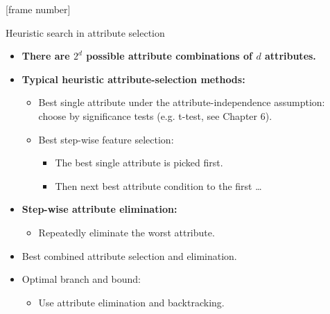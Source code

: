 \documentclass[aspectratio=169,t]{beamer}
\begin{document}
  {
    [frame number]
    \begin{frame}{Heuristic search in attribute selection}
    \begin{itemize}
      \item \textbf{There are $2^d$ possible attribute combinations of $d$ attributes.}
      \item\textbf{\color{airforceblue}Typical heuristic attribute-selection methods:}
      \begin{itemize}
        \item Best single attribute under the attribute-independence assumption: \\ choose by significance tests (e.g. t-test, see Chapter 6).
        \item Best step-wise feature selection:
        \begin{itemize}
          \item The best single attribute is picked first.
          \item Then next best attribute condition to the first \ldots
        \end{itemize}
      \end{itemize}
      \item \textbf{\color{airforceblue}Step-wise attribute elimination:}
      \begin{itemize}
        \item Repeatedly eliminate the worst attribute.
      \end{itemize}
      \item Best combined attribute selection and elimination.
      \item Optimal branch and bound:
      \begin{itemize}
        \item Use attribute elimination and backtracking.
      \end{itemize}
    \end{itemize}
    \end{frame}
  }
\end{document}
